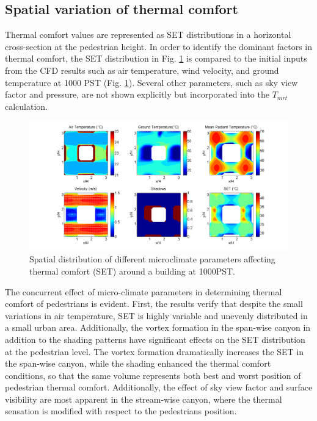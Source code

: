 \documentclass[smallextended]{svjour3}
\begin{document}
\subsection{Spatial variation of thermal comfort}
Thermal comfort values are represented as SET distributions in a horizontal cross-section at the pedestrian height. In order to identify the dominant factors in thermal comfort, the SET distribution in Fig. \ref{Fig.Parameters} is compared to the initial inputs from the CFD results such as air temperature, wind velocity, and ground temperature at 1000 PST (Fig. \ref{Fig.Parameters}). Several other parameters, such as sky view factor and pressure, are not shown explicitly but incorporated into the $T_{mrt}$ calculation.  

\begin{figure}[!h] \centering  
\graphicspath{ {image/} }
\includegraphics[width=\textwidth]{1000PST_flux.png}
\hskip 0.5in
\caption{Spatial distribution of different microclimate parameters affecting thermal comfort (SET) around a building at 1000PST.} 
\label{Fig.Parameters}
\end{figure}

The concurrent effect of micro-climate parameters in determining thermal comfort of pedestrians is evident. First, the results verify that despite the small variations in air temperature, SET is highly variable and unevenly distributed in a small urban area. Additionally, the vortex formation in the span-wise canyon in addition to the shading patterns have significant effects on the SET distribution at the pedestrian level. The vortex formation dramatically increases the SET in the span-wise canyon, while the shading enhanced the thermal comfort conditions, so that the same volume represents both best and worst position of pedestrian thermal comfort. Additionally, the effect of sky view factor and surface visibility are most apparent in the stream-wise canyon, where the thermal sensation is modified with respect to the pedestrians position. 
\end{document}
